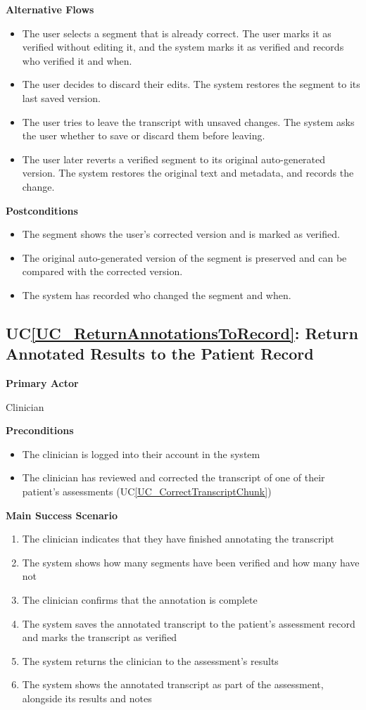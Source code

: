 \documentclass[12pt]{article}
\newcounter{ucnum} %
\newcommand{\ucref}[1]{UC\ref{#1}}
\begin{document}
\textbf{Alternative Flows}
\begin{itemize}
\item[1a.] The user selects a segment that is already correct. The user marks it as verified without editing it, and the system marks it as verified and records who verified it and when.
\item[6a.] The user decides to discard their edits. The system restores the segment to its last saved version.
\item[6b.] The user tries to leave the transcript with unsaved changes. The system asks the user whether to save or discard them before leaving.
\item[8a.] The user later reverts a verified segment to its original auto-generated version. The system restores the original text and metadata, and records the change.
\end{itemize}

\textbf{Postconditions}
\begin{itemize}
\item The segment shows the user’s corrected version and is marked as verified.
\item The original auto-generated version of the segment is preserved and can be compared with the corrected version.
\item The system has recorded who changed the segment and when.
\end{itemize}

 \label{UC_ReturnAnnotationsToRecord}
\subsection{\ucref{UC_ReturnAnnotationsToRecord}: Return Annotated Results to the Patient Record}

\textbf{Primary Actor}

Clinician

\textbf{Preconditions}
\begin{itemize}
\item The clinician is logged into their account in the system
\item The clinician has reviewed and corrected the transcript of one of their patient’s assessments (\ucref{UC_CorrectTranscriptChunk})
\end{itemize}

\textbf{Main Success Scenario}
\begin{enumerate}
\item The clinician indicates that they have finished annotating the transcript
\item The system shows how many segments have been verified and how many have not
\item The clinician confirms that the annotation is complete
\item The system saves the annotated transcript to the patient’s assessment record and marks the transcript as verified
\item The system returns the clinician to the assessment’s results
\item The system shows the annotated transcript as part of the assessment, alongside its results and notes
\end{enumerate}
\end{document}
